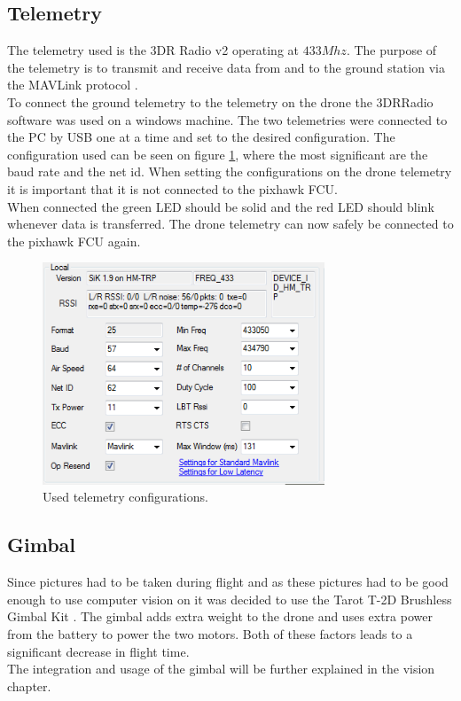 \subsection*{Telemetry}
The telemetry used is the 3DR Radio v2 \cite{Ref:Telem} operating at $433 Mhz$. The purpose of the telemetry is to transmit and receive data from and to the ground station via the MAVLink protocol \cite{Ref:MAVLink}.\\
To connect the ground telemetry to the telemetry on the drone the 3DRRadio software was used on a windows machine. The two telemetries were connected to the PC by USB one at a time and set to the desired configuration. The configuration used can be seen on figure \ref{fig:telem}, where the most significant are the baud rate and the net id. When setting the configurations on the drone telemetry it is important that it is not connected to the pixhawk FCU.\\
When connected the green LED should be solid and the red LED should blink whenever data is transferred. The drone telemetry can now safely be connected to the pixhawk FCU again.

\begin{figure}[H]
  \centering
    \includegraphics[width=0.75\textwidth]{./Images/telem}
  \caption{Used telemetry configurations.}
  \label{fig:telem}
\end{figure}

\subsection*{Gimbal}
Since pictures had to be taken during flight and as these pictures had to be good enough to use computer vision on it was decided to use the Tarot T-2D Brushless Gimbal Kit \cite{Ref:Gimbal}. The gimbal adds extra weight to the drone and uses extra power from the battery to power the two motors. Both of these factors leads to a significant decrease in flight time.\\
The integration and usage of the gimbal will be further explained in the vision chapter. 
